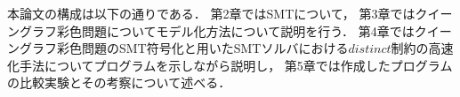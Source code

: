 %
%
%
%
%


本論文の構成は以下の通りである．
第2章ではSMTについて，
第3章ではクイーングラフ彩色問題についてモデル化方法について説明を行う．
第4章ではクイーングラフ彩色問題のSMT符号化と用いたSMTソルバにおける$distinct$制約の高速化手法についてプログラムを示しながら説明し，
第5章では作成したプログラムの比較実験とその考察について述べる．

